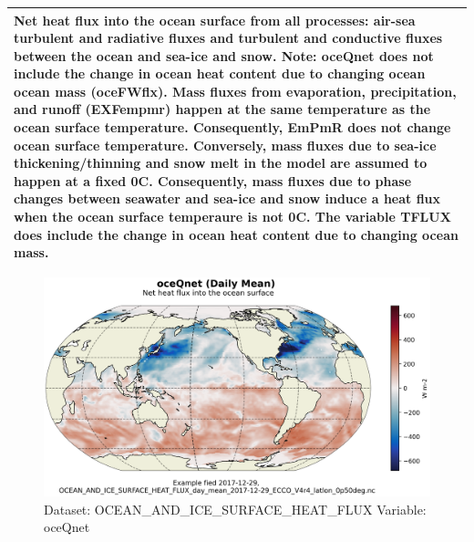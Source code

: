 \begin{longtable}{|m{}|m{}|m{}|m{}|}
\multicolumn{4}{|p{1\textwidth}|}{Net heat flux into the ocean surface from all processes: air-sea turbulent and radiative fluxes and turbulent and conductive fluxes between the ocean and sea-ice and snow. Note: oceQnet does not include the change in ocean heat content due to changing ocean ocean mass (oceFWflx). Mass fluxes from evaporation, precipitation, and runoff (EXFempmr) happen at the same temperature as the ocean surface temperature. Consequently, EmPmR does not change ocean surface temperature. Conversely, mass fluxes due to sea-ice thickening/thinning and snow melt in the model are assumed to happen at a fixed 0C. Consequently, mass fluxes due to phase changes between seawater and sea-ice and snow induce a heat flux when the ocean surface temperaure is not 0C. The variable TFLUX does include the change in ocean heat content due to changing ocean mass.} \\ \hline
\end{longtable}

\begin{figure}[H]
\centering
\includegraphics[scale=0.55]{../images/plots/latlon_plots/Ocean_and_Sea-Ice_Surface_Heat_Fluxes/oceQnet.png}
\caption{Dataset: OCEAN\_AND\_ICE\_SURFACE\_HEAT\_FLUX Variable: oceQnet}
\label{tab:table-OCEAN_AND_ICE_SURFACE_HEAT_FLUX_oceQnet-Plot}
\end{figure}
\pagebreak
